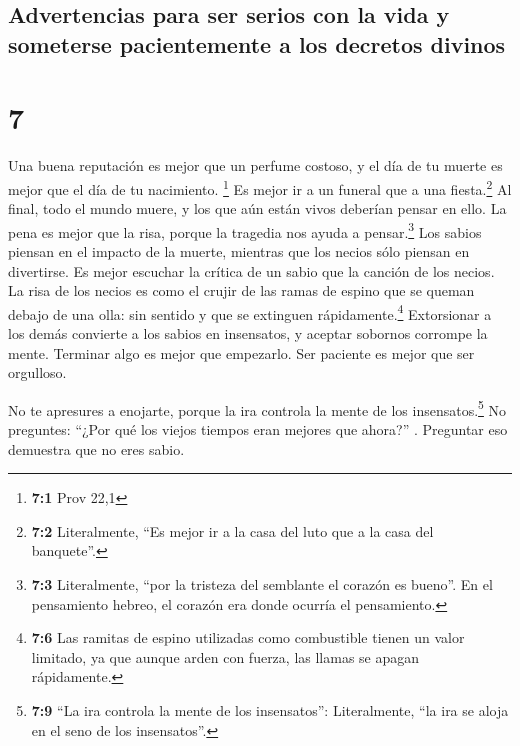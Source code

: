\hypertarget{advertencias-para-ser-serios-con-la-vida-y-someterse-pacientemente-a-los-decretos-divinos}{%
\subsection{Advertencias para ser serios con la vida y someterse
pacientemente a los decretos
divinos}\label{advertencias-para-ser-serios-con-la-vida-y-someterse-pacientemente-a-los-decretos-divinos}}

\hypertarget{section-6}{%
\section{7}\label{section-6}}

 Una buena reputación es mejor que un perfume costoso, y
el día de tu muerte es mejor que el día de tu nacimiento. \footnote{\textbf{7:1}
  Prov 22,1}  Es mejor ir a un funeral que a una
fiesta.\footnote{\textbf{7:2} Literalmente, ``Es mejor ir a la casa del
  luto que a la casa del banquete''.} Al final, todo el mundo muere, y
los que aún están vivos deberían pensar en ello.  La pena
es mejor que la risa, porque la tragedia nos ayuda a pensar.\footnote{\textbf{7:3}
  Literalmente, ``por la tristeza del semblante el corazón es bueno''.
  En el pensamiento hebreo, el corazón era donde ocurría el pensamiento.}
 Los sabios piensan en el impacto de la muerte, mientras
que los necios sólo piensan en divertirse.  Es mejor
escuchar la crítica de un sabio que la canción de los necios.
 La risa de los necios es como el crujir de las ramas de
espino que se queman debajo de una olla: sin sentido y que se extinguen
rápidamente.\footnote{\textbf{7:6} Las ramitas de espino utilizadas como
  combustible tienen un valor limitado, ya que aunque arden con fuerza,
  las llamas se apagan rápidamente.}  Extorsionar a los
demás convierte a los sabios en insensatos, y aceptar sobornos corrompe
la mente.  Terminar algo es mejor que empezarlo. Ser
paciente es mejor que ser orgulloso.

 No te apresures a enojarte, porque la ira controla la
mente de los insensatos.\footnote{\textbf{7:9} ``La ira controla la
  mente de los insensatos'': Literalmente, ``la ira se aloja en el seno
  de los insensatos''.}  No preguntes: ``¿Por qué los
viejos tiempos eran mejores que ahora?'' . Preguntar eso demuestra que
no eres sabio.

